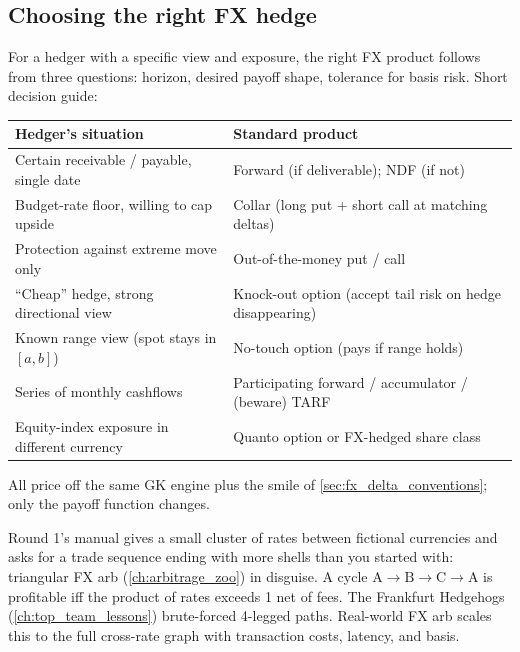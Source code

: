 \subsection{Choosing the right FX hedge}

For a hedger with a specific view and exposure, the right FX
product follows from three questions: horizon, desired payoff shape,
tolerance for basis risk.  Short decision guide:
\begin{center}
\small
\begin{tabular}{@{}p{} p{}@{}}
\toprule
\textbf{Hedger's situation} & \textbf{Standard product} \\
\midrule
Certain receivable / payable, single date &
  Forward (if deliverable); NDF (if not) \\
Budget-rate floor, willing to cap upside &
  Collar (long put + short call at matching deltas) \\
Protection against extreme move only &
  Out-of-the-money put / call \\
``Cheap'' hedge, strong directional view &
  Knock-out option (accept tail risk on hedge disappearing) \\
Known range view (spot stays in $[a,b]$) &
  No-touch option (pays if range holds) \\
Series of monthly cashflows &
  Participating forward / accumulator / (beware) TARF \\
Equity-index exposure in different currency &
  Quanto option or FX-hedged share class \\
\bottomrule
\end{tabular}
\end{center}
All price off the same GK engine plus the smile of
\cref{sec:fx_delta_conventions}; only the payoff function changes.


\begin{prosperitybox}[title={Prosperity Round 1 manual: triangular FX}]
Round 1's manual gives a small cluster of rates between fictional
currencies and asks for a trade sequence ending with more shells
than you started with: triangular FX arb
(\cref{ch:arbitrage_zoo}) in disguise.  A cycle
$\mathrm{A} \to \mathrm{B} \to \mathrm{C} \to \mathrm{A}$ is
profitable iff the product of rates exceeds 1 net of fees.  The
Frankfurt Hedgehogs (\cref{ch:top_team_lessons}) brute-forced
4-legged paths.  Real-world FX arb scales this to the full
cross-rate graph with transaction costs, latency, and basis.
\end{prosperitybox}

